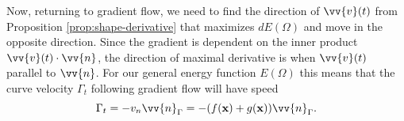 Now, returning to gradient flow, we need to find the direction of $\vv{v}(t)$ from Proposition \ref{prop:shape-derivative} that maximizes $dE(\Omega)$ and move in the opposite direction. Since the gradient is dependent on the inner product $\vv{v}(t)\cdot \vv{n}$, the direction of maximal derivative is when $\vv{v}(t)$ parallel to $\vv{n}$. For our general energy function $E(\Omega)$ this means that the curve velocity $\Gamma_t$ following gradient flow will have speed
\begin{equation}
    \Gamma_t = -v_n \vv{n}_{\Gamma} = -(f(\mathbf{x}) + g(\mathbf{x})) \vv{n}_{\Gamma}.
    \label{eq:optimal-descent}
\end{equation}



